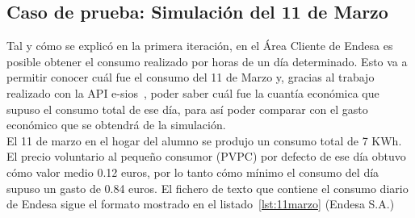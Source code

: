 \subsection{Caso de prueba: Simulación del 11 de Marzo}
Tal y cómo se explicó en la primera iteración, en el Área Cliente de Endesa es posible obtener el consumo realizado por horas de un día determinado. Esto va a permitir conocer cuál fue el consumo del 11 de Marzo y, gracias al trabajo realizado con la API e-sios~\cite{Ree}, poder saber cuál fue la cuantía económica que supuso el consumo total de ese día, para así poder comparar con el gasto económico que se obtendrá de la simulación.\\

El 11 de marzo en el hogar del alumno se produjo un consumo total de 7 KWh. El precio voluntario al pequeño consumor (PVPC) por defecto de ese día obtuvo cómo valor medio 0.12 euros, por lo tanto cómo mínimo el consumo del día supuso un gasto de 0.84 euros. El fichero de texto que contiene el consumo diario de Endesa sigue el formato mostrado en el listado~\ref{lst:11marzo} (\textcopyright Endesa S.A.)\\

